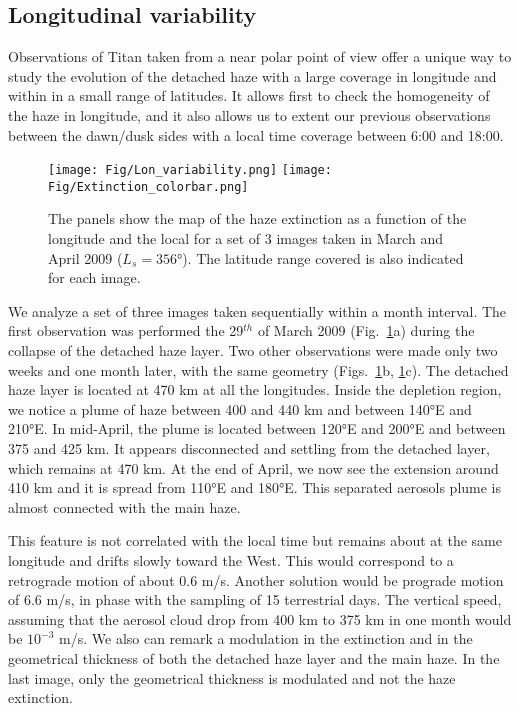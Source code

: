 \subsection{Longitudinal variability}

Observations of Titan taken from a near polar point of view offer a unique way to study the evolution of
the detached haze with a large coverage in longitude and within in a small range of latitudes. It allows
first to check the homogeneity of the haze in longitude, and it also allows us to extent our previous
observations between the dawn/dusk sides with a local time coverage between 6:00 and 18:00.

\begin{figure}[!ht]
    \centering
    \texttt{[image: Fig/Lon\_variability.png]}
    \texttt{[image: Fig/Extinction\_colorbar.png]}\vspace{-.3cm}
    \caption{The panels show the map of the haze extinction as a function of the longitude and the local
    for a set of 3 images taken in March and April 2009 ($L_s=\ang{356}$). The latitude range covered is
    also indicated for each image.}
    \label{fig:lon_variability}
\end{figure}

We analyze a set of three images taken sequentially within a month interval. The first observation
was performed the 29$^{th}$ of March 2009 (Fig.~\ref{fig:lon_variability}a) during the collapse of the detached
haze layer. Two other observations were made only two weeks and one month later, with the same geometry
(Figs.~\ref{fig:lon_variability}b, \ref{fig:lon_variability}c). The detached haze layer is
located at 470 km at all the longitudes. Inside the depletion region, we notice a plume of haze
between 400 and 440 km and between \ang{140}E and \ang{210}E. In mid-April, the plume is located between
\ang{120}E and \ang{200}E and between 375 and 425 km. It appears disconnected and settling from the detached
layer, which remains at 470 km. At the end of April, we now see the extension around 410 km and it
is spread from \ang{110}E and \ang{180}E. This separated aerosols plume is almost connected with the main haze.

This feature is not correlated with the local time but remains about at the same longitude and drifts slowly
toward the West. This would correspond to a retrograde motion of about 0.6 m/s. Another solution would be
prograde motion of 6.6 m/s, in phase with the sampling of 15 terrestrial days. The vertical speed, assuming
that the aerosol cloud drop from 400 km to 375 km in one month would be $10^{-3}$ m/s. We also can remark a
modulation in the extinction and in the geometrical thickness of both the detached haze layer and the main
haze. In the last image, only the geometrical thickness is modulated and not the haze extinction.

